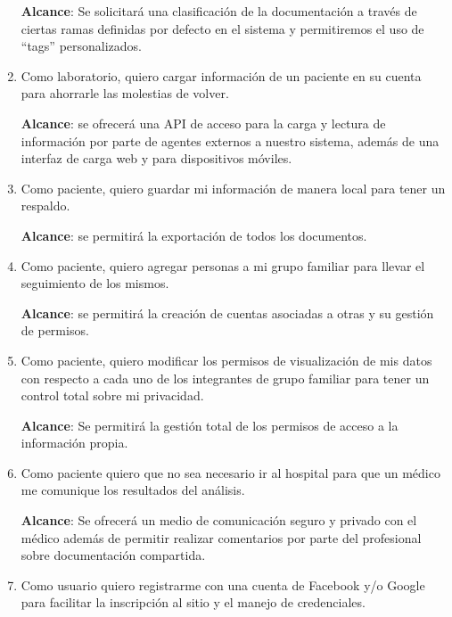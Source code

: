 \begin{enumerate}
    \textbf{Alcance}: Se solicitará una clasificación de la documentación a través de ciertas ramas definidas por defecto en el sistema y permitiremos el uso de ``tags'' personalizados.
	\item Como laboratorio, quiero cargar información de un paciente en su cuenta para ahorrarle las molestias de volver.
    
   \textbf{Alcance}: se ofrecerá una API de acceso para la carga y lectura de información por parte de agentes externos a nuestro sistema, además de una interfaz de carga web y para dispositivos móviles.
    \item Como paciente, quiero guardar mi información de manera local para tener un respaldo.
    
    \textbf{Alcance}: se permitirá la exportación de todos los documentos.
	\item Como paciente, quiero agregar personas a mi grupo familiar para llevar el seguimiento de los mismos.
    
    \textbf{Alcance}: se permitirá la creación de cuentas asociadas a otras y su gestión de permisos.
	\item Como paciente, quiero modificar los permisos de visualización de mis datos con respecto a  cada uno de los integrantes de grupo familiar para tener un control total sobre mi privacidad.
    
    \textbf{Alcance}: Se permitirá la gestión total de los permisos de acceso a la información propia.
	\item Como paciente quiero que no sea necesario ir al hospital para que un médico me comunique los resultados del análisis.
    
    \textbf{Alcance}: Se ofrecerá un medio de comunicación seguro y privado con el médico además de permitir realizar comentarios por parte del profesional sobre documentación compartida.
    
	\item Como usuario quiero registrarme con una cuenta de Facebook y/o Google para facilitar la inscripción al sitio y el manejo de credenciales.
    

\end{enumerate}
